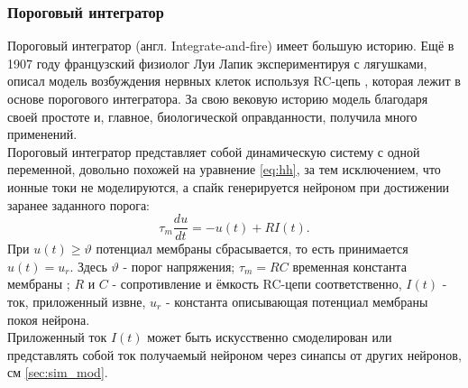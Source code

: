 \documentclass[a4paper,10pt]{article}
\begin{document}
\subsubsection{Пороговый интегратор}
\indent Пороговый интегратор (англ. Integrate-and-fire) имеет большую историю. Ещё в 1907 году 	французский физиолог Луи Лапик экспериментируя с лягушками, описал модель возбуждения нервных клеток используя RC-цепь \cite{Lapicque}, которая лежит в основе порогового интегратора. За свою вековую историю модель благодаря своей простоте и, главное, биологической оправданности, получила много применений.\\
   \indent Пороговый интегратор представляет собой динамическую систему с одной переменной, довольно похожей на уравнение \eqref{eq:hh}, за тем исключением, что ионные токи не моделируются, а спайк генерируется нейроном при достижении заранее заданного порога:\\
   \begin{equation}\label{eq:iaf}
   \tau_{m}\frac{du}{dt} =-u(t)+R I(t).
   \end{equation}
При $u(t) \geq \vartheta$ потенциал мембраны сбрасывается, то есть принимается $u(t)=u_{r}$.
Здесь $\vartheta$ - порог напряжения; $\tau_{m}=RC$ временная константа мембраны ; $R$ и $C$ - сопротивление и ёмкость RC-цепи соответственно, $I(t)$ - ток, приложенный извне, $u_{r}$ - константа описывающая потенциал мембраны покоя нейрона.\\
\indent Приложенный ток $I(t)$ может быть искусственно смоделирован или представлять собой ток получаемый нейроном через синапсы от других нейронов, см  \ref{sec:sim_mod}.
\end{document}
